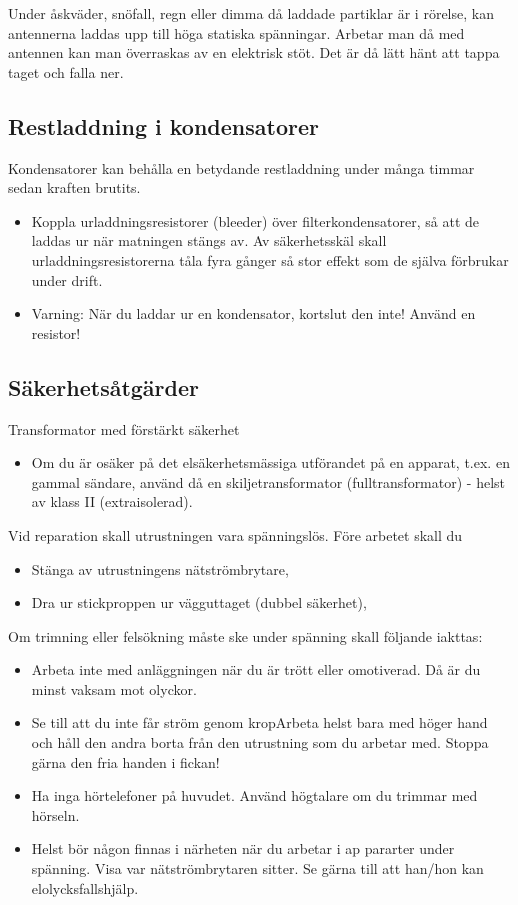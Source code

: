 Under åskväder, snöfall, regn eller dimma då laddade partiklar är i
rörelse, kan antennerna laddas upp till höga statiska
spänningar. Arbetar man då med antennen kan man överraskas av en
elektrisk stöt. Det är då lätt hänt att tappa taget och falla ner.

\subsection{Restladdning i kondensatorer}

Kondensatorer kan behålla en betydande restladdning under många timmar
sedan kraften brutits.
\begin{itemize}
\item Koppla urladdningsresistorer (bleeder) över filterkondensatorer,
  så att de laddas ur när matningen stängs av. Av säkerhetsskäl skall
  urladdningsresistorerna tåla fyra gånger så stor effekt som de
  själva förbrukar under drift.
\item Varning: När du laddar ur en kondensator, kortslut den inte! Använd
  en resistor!
\end{itemize}

\subsection{Säkerhetsåtgärder}

Transformator med förstärkt säkerhet
\begin{itemize}
\item Om du är osäker på det elsäkerhetsmässiga utförandet på en
  apparat, t.ex. en gammal sändare, använd då en skiljetransformator
  (fulltransformator) - helst av klass II (extraisolerad).
\end{itemize}

Vid reparation skall utrustningen vara spänningslös. Före arbetet skall du
\begin{itemize}
\item Stänga av utrustningens nätströmbrytare,
\item Dra ur stickproppen ur vägguttaget (dubbel säkerhet),
\end{itemize}

Om trimning eller felsökning måste ske under spänning skall följande iakttas:
\begin{itemize}
\item Arbeta inte med anläggningen när du är trött eller
  omotiverad. Då är du minst vaksam mot olyckor.
\item Se till att du inte får ström genom kropArbeta helst bara med
  höger hand och håll den andra borta från den utrustning som du
  arbetar med. Stoppa gärna den fria handen i fickan!
\item Ha inga hörtelefoner på huvudet. Använd högtalare om du trimmar
  med hörseln.
\item Helst bör någon finnas i närheten när du arbetar i ap pararter
  under spänning. Visa var nätströmbrytaren sitter. Se gärna till att
  han/hon kan elolycksfallshjälp.
\end{itemize}

